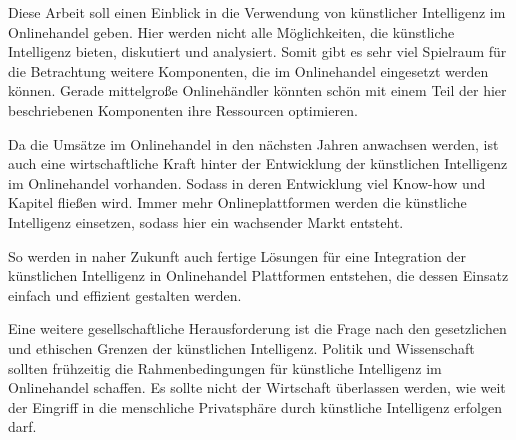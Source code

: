 Diese Arbeit soll einen Einblick in die Verwendung von künstlicher Intelligenz im Onlinehandel geben. Hier werden nicht alle Möglichkeiten, die künstliche Intelligenz bieten, diskutiert und analysiert. Somit gibt es sehr viel Spielraum für die Betrachtung weitere Komponenten, die im Onlinehandel eingesetzt werden können. Gerade mittelgroße Onlinehändler könnten schön mit einem Teil der hier beschriebenen Komponenten ihre Ressourcen optimieren.\vspace{0.2cm}

Da die Umsätze im Onlinehandel in den nächsten Jahren anwachsen werden, ist auch eine wirtschaftliche Kraft hinter der Entwicklung der künstlichen Intelligenz im Onlinehandel vorhanden. Sodass in deren Entwicklung viel Know-how und Kapitel fließen wird. Immer mehr Onlineplattformen werden die künstliche Intelligenz einsetzen, sodass hier ein wachsender Markt entsteht.\vspace{0.2cm}

So werden in naher Zukunft auch fertige Lösungen für eine Integration der künstlichen Intelligenz in Onlinehandel Plattformen entstehen, die dessen Einsatz einfach und effizient gestalten werden.\vspace{0.2cm}

Eine weitere gesellschaftliche Herausforderung ist die Frage nach den gesetzlichen und ethischen Grenzen der künstlichen Intelligenz. Politik und Wissenschaft sollten frühzeitig die Rahmenbedingungen für künstliche Intelligenz im Onlinehandel schaffen. Es sollte nicht der Wirtschaft überlassen werden, wie weit der Eingriff in die menschliche Privatsphäre durch künstliche Intelligenz erfolgen darf.

